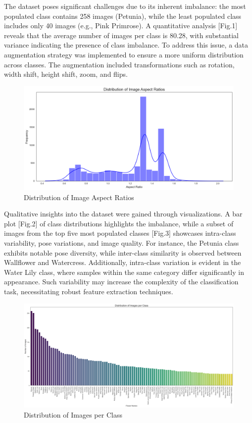 The dataset poses significant challenges due to its inherent imbalance: the most populated class contains 258 images
(Petunia), while the least populated class includes only 40 images (e.g., Pink Primrose). A quantitative analysis
[Fig.1] reveals that the average number of images per class is 80.28, with substantial variance indicating the presence
of class imbalance. To address this issue, a data augmentation strategy was implemented to ensure a more uniform distribution
across classes. The augmentation included transformations such as rotation, width shift, height shift, zoom, and flips.

\begin{figure}[h!]
    \centering
    \includegraphics[width=\linewidth]{Images/Distribution of Image Aspect Ratios}
    \caption{Distribution of Image Aspect Ratios}
\end{figure}


Qualitative insights into the dataset were gained through visualizations. A bar plot [Fig.2] of class distributions highlights
the imbalance, while a subset of images from the top five most populated classes [Fig.3] showcases intra-class variability,
pose variations, and image quality. For instance, the Petunia class exhibits notable pose diversity, while inter-class
similarity is observed between Wallflower and Watercress. Additionally, intra-class variation is evident in the Water
Lily class, where samples within the same category differ significantly in appearance. Such variability may increase
the complexity of the classification task, necessitating robust feature extraction techniques.

\begin{figure}[h!]
    \centering
    \includegraphics[width=\linewidth]{Images/Distribution of Images per Class}
    \caption{Distribution of Images per Class}
\end{figure}


